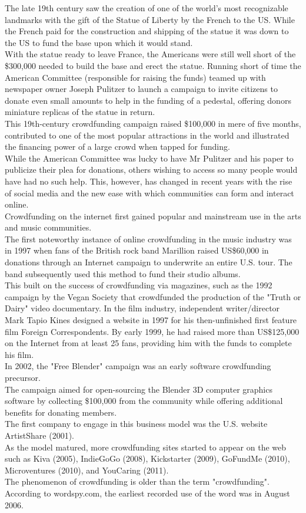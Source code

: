 The late 19th century saw the creation of one of the world’s most recognizable landmarks with the gift of the Statue of Liberty by the French to the US. While the French paid for the construction and shipping of the statue it was down to the US to fund the base upon which it would stand.\\
With the statue ready to leave France, the Americans were still well short of the \$300,000 needed to build the base and erect the statue. Running short of time the American Committee (responsible for raising the funds) teamed up with newspaper owner Joseph Pulitzer to launch a campaign to invite citizens to donate even small amounts to help in the funding of a pedestal, offering donors miniature replicas of the statue in return.\\
This 19th-century crowdfunding campaign raised \$100,000 in mere of five months, contributed to one of the most popular attractions in the world and illustrated the financing power of a large crowd when tapped for funding.\\While the American Committee was lucky to have Mr Pulitzer and his paper to publicize their plea for donations, others wishing to access so many people would have had no such help. This, however, has changed in recent years with the rise of social media and the new ease with which communities can form and interact online.\\
Crowdfunding on the internet first gained popular and mainstream use in the arts and music communities.\\
The first noteworthy instance of online crowdfunding in the music industry was in 1997 when fans of the British rock band Marillion raised US\$60,000 in donations through an Internet campaign to underwrite an entire U.S. tour. The band subsequently used this method to fund their studio albums.\\
This built on the success of crowdfunding via magazines, such as the 1992 campaign by the Vegan Society that crowdfunded the production of the "Truth or Dairy" video documentary.
In the film industry, independent writer/director Mark Tapio Kines designed a website in 1997 for his then-unfinished first feature film Foreign Correspondents. By early 1999, he had raised more than US\$125,000 on the Internet from at least 25 fans, providing him with the funds to complete his film.\\
In 2002, the "Free Blender" campaign was an early software crowdfunding precursor.\\
The campaign aimed for open-sourcing the Blender 3D computer graphics software by collecting \$100,000 from the community while offering additional benefits for donating members.\\
The first company to engage in this business model was the U.S. website ArtistShare (2001).\\
As the model matured, more crowdfunding sites started to appear on the web such as Kiva (2005), IndieGoGo (2008), Kickstarter (2009), GoFundMe (2010), Microventures (2010), and YouCaring (2011).\\
The phenomenon of crowdfunding is older than the term "crowdfunding". According to wordspy.com, the earliest recorded use of the word was in August 2006.
